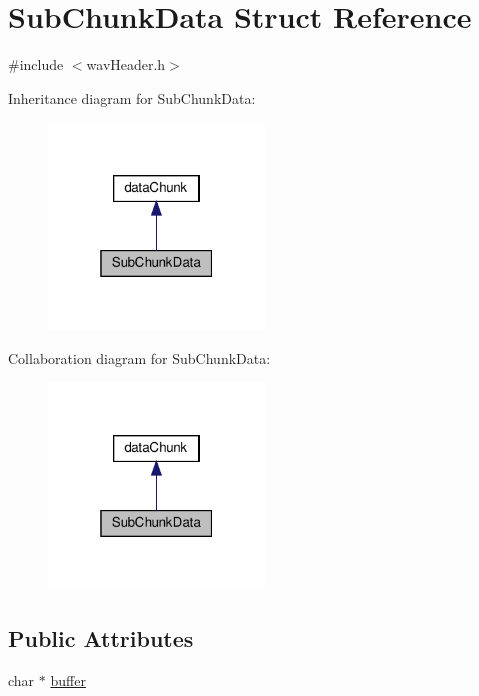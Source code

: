 \hypertarget{structSubChunkData}{}\section{Sub\+Chunk\+Data Struct Reference}
\label{structSubChunkData}


{\ttfamily \#include $<$wav\+Header.\+h$>$}



Inheritance diagram for Sub\+Chunk\+Data\+:\nopagebreak
\begin{figure}[H]
\begin{center}
\leavevmode
\includegraphics[width=163pt]{structSubChunkData__inherit__graph}
\end{center}
\end{figure}


Collaboration diagram for Sub\+Chunk\+Data\+:\nopagebreak
\begin{figure}[H]
\begin{center}
\leavevmode
\includegraphics[width=163pt]{structSubChunkData__coll__graph}
\end{center}
\end{figure}
\subsection*{Public Attributes}
\begin{DoxyCompactItemize}
\item 
char $\ast$ \hyperlink{structSubChunkData_a8f026b9f6a0e1f74318438e61656955e}{buffer}
\end{DoxyCompactItemize}


